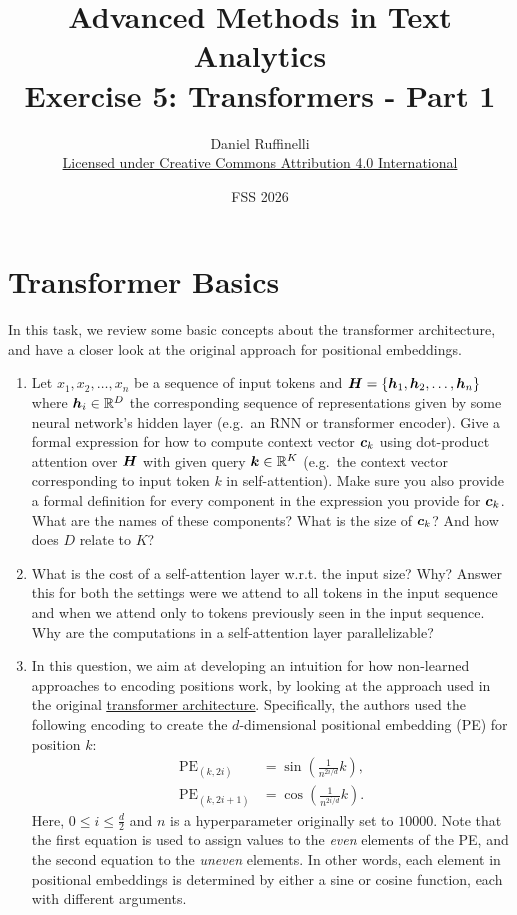 \documentclass[11pt,a4paper]{article}
\title{Advanced Methods in Text Analytics \\ 
Exercise 5: Transformers - Part 1}
\author{Daniel Ruffinelli \\ \href{https://creativecommons.org/licenses/by/4.0/}{Licensed under Creative Commons Attribution 4.0 International}}
\date{FSS 2026}
\begin{document}
\maketitle

\section{Transformer Basics}

In this task, we review some basic concepts about the transformer architecture,
and have a closer look at the original approach for positional embeddings.

\begin{enumerate}[label=(\alph*)]
    \item Let $x_1,x_2,\ldots, x_n$ be a sequence of input tokens and
          ${\boldsymbol{H}} = \{{\boldsymbol{h}}_1,{\boldsymbol{h}}_2,\ldots, {\boldsymbol{h}}_n\}$ where ${\boldsymbol{h}}_i\in\mathbb{R}^D$ the
          corresponding sequence of representations given by some neural
          network's hidden layer (e.g.\ an RNN or transformer encoder).
          Give a formal expression for how to compute context vector ${\boldsymbol{c}}_k$
          using dot-product attention over ${\boldsymbol{H}}$ with given query
          ${\boldsymbol{k}}\in\mathbb{R}^K$ (e.g.\ the context vector corresponding to input
          token $k$ in self-attention).
          Make sure you also provide a formal definition for every component in
          the expression you provide for ${\boldsymbol{c}}_k$.
          What are the names of these components? What is the size of ${\boldsymbol{c}}_k$?
          And how does $D$ relate to $K$?
    \item What is the cost of a self-attention layer w.r.t. the input size?
          Why? Answer this for both the settings were we attend to all tokens in
          the input sequence and when we attend only to tokens previously seen
          in the input sequence.
          Why are the computations in a self-attention layer parallelizable?
    \item In this question, we aim at developing an intuition for how
          non-learned approaches to encoding positions work, by looking at the
          approach used in the original
          \href{https://arxiv.org/pdf/1706.03762.pdf}{\underline{transformer architecture}}.
          Specifically, the authors used the following encoding to create the
          $d$-dimensional positional embedding (PE) for position $k$:
          \begin{align*}
              \operatorname{PE}_{(k,2i)}   & = \sin\left(\frac{1}{n^{2i/d}}k\right), \\
              \operatorname{PE}_{(k,2i+1)} & = \cos\left(\frac{1}{n^{2i/d}}k\right).
          \end{align*}
          Here, $0\leq i \leq \frac{d}{2}$ and $n$ is a hyperparameter originally
          set to $10000$.
          Note that the first equation is used to assign values to the
          \emph{even} elements of the PE, and the second equation to the
          \emph{uneven} elements.
          In other words, each element in positional embeddings is determined
          by either a sine or cosine function, each with different arguments.


\end{enumerate}
\end{document}

